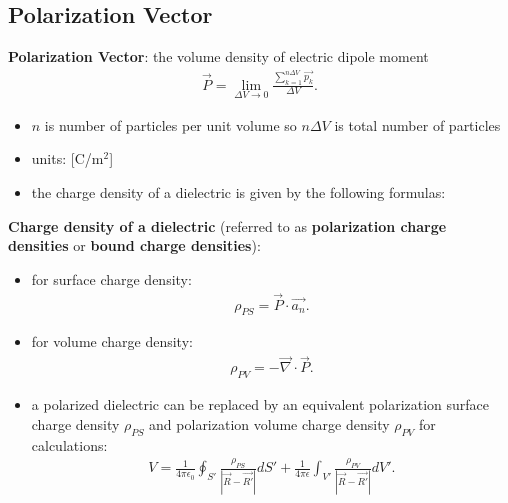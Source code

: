 \documentclass[10pt]{article}
\begin{document}
\subsection{Polarization Vector}
\begin{definition}
    \textbf{Polarization Vector}: the volume density of electric dipole moment
    \begin{gather*}
        \vec{P} = \lim_{\Delta V \to 0} \frac{\sum_{k=1}^{n\Delta V} \vec{p_k}}{\Delta V}
    .\end{gather*}
    \begin{itemize}
        \item $n$ is number of particles per unit volume so $n \Delta V$ is total number of particles
        \item units: [C/m$^2$]
    \end{itemize}
\end{definition}
\begin{itemize}
    \item the charge density of a dielectric is given by the following formulas:
\end{itemize}
\begin{theorem}
    \textbf{Charge density of a dielectric} (referred to as \textbf{polarization charge densities} or \textbf{bound charge densities}):
    \begin{itemize}
        \item for surface charge density:
            \begin{gather*}
                \rho_{PS} = \vec{P} \cdot \vec{a_n}
            .\end{gather*}
        \item for volume charge density:
            \begin{gather*}
                \rho_{PV} = - \vec{\nabla} \cdot \vec{P}
            .\end{gather*}
    \end{itemize}
\end{theorem}
\begin{itemize}
    \item a polarized dielectric can be replaced by an equivalent polarization surface charge density $\rho_{PS}$ and polarization volume charge density $\rho_{PV}$ for calculations:
        \begin{gather*}
            V = \frac{1}{4\pi\epsilon_0} \oint_{S'} \frac{\rho_{PS}}{|\vec{R}-\vec{R'}|} dS' + \frac{1}{4\pi\epsilon} \int_{V'} \frac{\rho_{PV}}{|\vec{R}-\vec{R'}|} dV'
        .\end{gather*}
\end{itemize}
\end{document}
